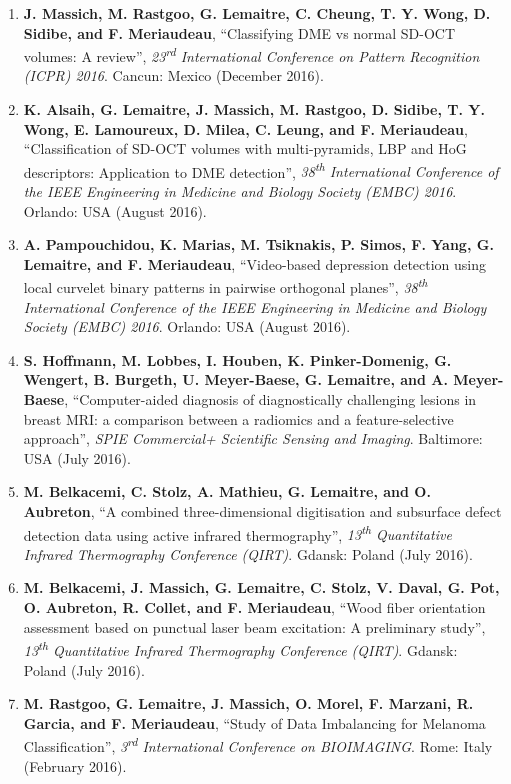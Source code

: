 \begin{publication}
\begin{enumerate}\scriptsize
\item \textbf{J. Massich, M. Rastgoo, G. Lemaitre, C. Cheung, T. Y. Wong, D. Sidibe, and F. Meriaudeau}, ``Classifying DME vs normal SD-OCT volumes: A review'', \textit{23\textsuperscript{rd} International Conference on Pattern Recognition (ICPR) 2016}. Cancun: Mexico (December 2016).
\item \textbf{K. Alsaih, G. Lemaitre, J. Massich, M. Rastgoo, D. Sidibe, T. Y. Wong, E. Lamoureux, D. Milea, C. Leung, and F. Meriaudeau}, ``Classification of SD-OCT volumes with multi-pyramids, LBP and HoG descriptors: Application to DME detection'', \textit{38\textsuperscript{th} International Conference of the IEEE Engineering in Medicine and Biology Society (EMBC) 2016}. Orlando: USA (August 2016).
\item \textbf{A. Pampouchidou, K. Marias, M. Tsiknakis, P. Simos, F. Yang, G. Lemaitre, and F. Meriaudeau}, ``Video-based depression detection using local curvelet binary patterns in pairwise orthogonal planes'', \textit{38\textsuperscript{th} International Conference of the IEEE Engineering in Medicine and Biology Society (EMBC) 2016}. Orlando: USA (August 2016).
\item \textbf{S. Hoffmann, M. Lobbes, I. Houben, K. Pinker-Domenig, G. Wengert, B. Burgeth, U. Meyer-Baese, G. Lemaitre, and A. Meyer-Baese}, ``Computer-aided diagnosis of diagnostically challenging lesions in breast MRI: a comparison between a radiomics and a feature-selective approach'', \textit{SPIE Commercial+ Scientific Sensing and Imaging}. Baltimore: USA (July 2016).
\item \textbf{M. Belkacemi, C. Stolz, A. Mathieu, G. Lemaitre, and O. Aubreton}, ``A combined three-dimensional digitisation and subsurface defect detection data using active infrared thermography'', \textit{13\textsuperscript{th} Quantitative Infrared Thermography Conference (QIRT)}. Gdansk: Poland (July 2016).
\item \textbf{M. Belkacemi, J. Massich, G. Lemaitre, C. Stolz, V. Daval, G. Pot, O. Aubreton, R. Collet, and F. Meriaudeau}, ``Wood fiber orientation assessment based on punctual laser beam excitation: A preliminary study'', \textit{13\textsuperscript{th} Quantitative Infrared Thermography Conference (QIRT)}. Gdansk: Poland (July 2016).
\item \textbf{M. Rastgoo, G. Lemaitre, J. Massich, O. Morel, F. Marzani, R. Garcia, and F. Meriaudeau}, ``Study of Data Imbalancing for Melanoma Classification'', \textit{3\textsuperscript{rd} International Conference on BIOIMAGING}. Rome: Italy (February 2016).

\end{enumerate}
\end{publication}
